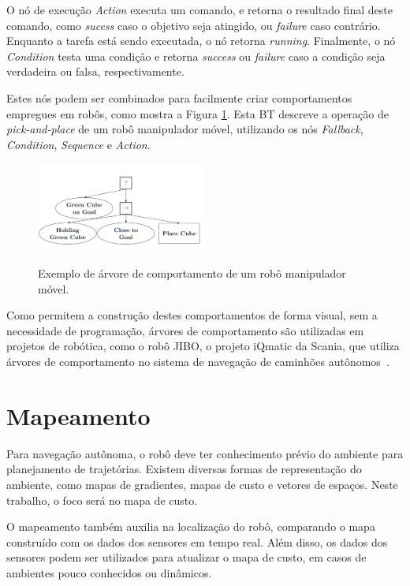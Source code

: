 \documentclass[repeatfields,xlists,xpacks,oneside,yearsonly]{ufrgscca}
\begin{document}
O nó de execução \textit{Action} executa um comando, e retorna o resultado final deste comando,
como \textit{sucess} caso o objetivo seja atingido, ou \textit{failure} caso contrário.
Enquanto a tarefa está sendo executada, o nó retorna \textit{running}.
Finalmente, o nó \textit{Condition} testa uma condição e retorna \textit{success} ou \textit{failure}
caso a condição	seja verdadeira ou falsa, respectivamente.

Estes nós podem ser combinados para facilmente criar comportamentos
empregues em robôs, como mostra a Figura \ref{fig:bt_exemplo}.
Esta BT descreve a operação de \textit{pick-and-place} de um robô manipulador móvel,
utilizando os nós \textit{Fallback}, \textit{Condition},
\textit{Sequence} e \textit{Action}.

\begin{figure}[htbp]
    {
        \centering
        \caption{Exemplo de árvore de comportamento de um robô manipulador móvel.}
        \label{fig:bt_exemplo}
        \includegraphics[width=0.5\textwidth]{bt_exemplo.png}\\
    }
    {}
\end{figure}

Como permitem a construção destes comportamentos de forma visual, sem a
necessidade de programação, árvores de comportamento são utilizadas em
projetos de robótica, como o robô JIBO, o projeto iQmatic da Scania, que
utiliza árvores de comportamento no sistema de navegação de caminhões
autônomos~\cite{BehaviorTree}.

\section{Mapeamento}

Para navegação autônoma, o robô deve ter conhecimento prévio do ambiente
para planejamento de trajetórias.
Existem diversas formas de representação do ambiente,
como mapas de gradientes, mapas de custo e vetores de espaços.
Neste trabalho, o foco será no mapa de custo.

O mapeamento também auxilia na localização do robô, comparando o mapa construído
com os dados dos sensores em tempo real. Além disso, os dados dos sensores podem ser
utilizados para atualizar o mapa de custo, em casos de ambientes pouco conhecidos ou dinâmicos.
\end{document}
